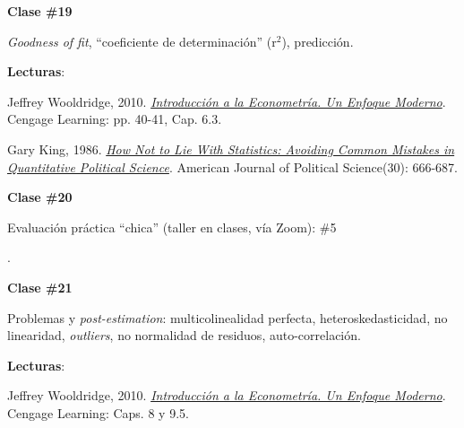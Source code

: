 \documentclass[letterpaper]{article}
\renewenvironment{itemize}{
  \begin{list}{}{
    \setlength{\leftmargin}{1.5em}
  }
}{
  \end{list}
}
\begin{document}
\begin{enumerate}
			\begin{itemize} 
				\item[$\bullet$] {\bf Clase \#19}
					\begin{itemize} 
						\item[$\circ$] \emph{Goodness of fit}, ``coeficiente de determinaci\'on'' (r$^2$), predicci\'on. 
						\item[$\circ$] {\bf Lecturas}:
							\begin{itemize} 
								\item[$\diamond$] Jeffrey Wooldridge, 2010. \href{https://github.com/hbahamonde/Metodos_de_Investigacion/raw/master/Readings/Wooldridge.pdf}{\emph{Introducci\'on a la Econometr\'ia. Un Enfoque Moderno}}. Cengage Learning: pp. 40-41, Cap. 6.3.
								\item[$\diamond$] Gary King, 1986. \href{https://github.com/hbahamonde/Metodos_de_Investigacion/raw/master/Readings/King.pdf}{\emph{How Not to Lie With Statistics: Avoiding Common Mistakes in Quantitative Political Science}}. American Journal of Political Science(30): 666-687.

							\end{itemize}
					\end{itemize}
			\end{itemize}



			\begin{itemize} 
				\item[$\bullet$] {\bf Clase \#20}
					\begin{itemize} 
						{\color{red}\item[\Pointinghand] Evaluaci\'on pr\'actica ``chica'' (taller en clases, v\'ia Zoom): \#5}. %
					\end{itemize}
			\end{itemize}




			\begin{itemize} 
				\item[$\bullet$] {\bf Clase \#21}
					\begin{itemize} 
						\item[$\circ$] Problemas y \emph{post-estimation}: multicolinealidad perfecta, heteroskedasticidad, no linearidad, \emph{outliers}, no normalidad de residuos, auto-correlaci\'on. %
						\item[$\circ$] {\bf Lecturas}: 
						\begin{itemize}
						\item[$\diamond$] Jeffrey Wooldridge, 2010. \href{https://github.com/hbahamonde/Metodos_de_Investigacion/raw/master/Readings/Wooldridge.pdf}{\emph{Introducci\'on a la Econometr\'ia. Un Enfoque Moderno}}. Cengage Learning: Caps. 8 y 9.5.
						\end{itemize}
					\end{itemize}
			\end{itemize}




\end{enumerate}
\end{document}
